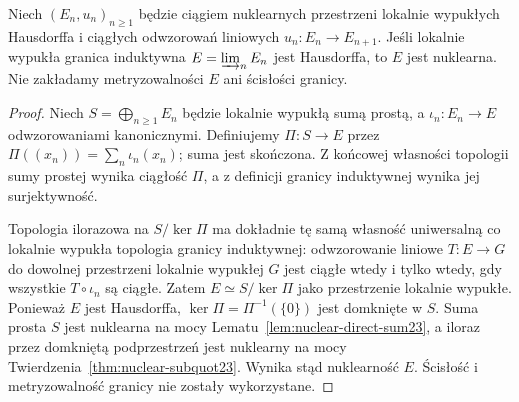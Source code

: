 \begin{twierdzenie}
\label{thm:nuclear-indlim23}
Niech $(E_n,u_n)_{n\ge1}$ będzie ciągiem nuklearnych
przestrzeni lokalnie wypukłych Hausdorffa i ciągłych
odwzorowań liniowych $u_n:E_n\to E_{n+1}$.
Jeśli lokalnie wypukła granica induktywna
$E=\varinjlim_n E_n$ jest Hausdorffa, to $E$ jest nuklearna.
Nie zakładamy metryzowalności $E$ ani ścisłości granicy.
\end{twierdzenie}
\begin{proof}
Niech $S=\bigoplus_{n\ge1}E_n$ będzie lokalnie wypukłą
sumą prostą, a $\iota_n:E_n\to E$ odwzorowaniami
kanonicznymi. Definiujemy
$\Pi:S\to E$ przez
$\Pi((x_n))=\sum_n\iota_n(x_n)$; suma jest skończona.
Z końcowej własności topologii sumy prostej wynika
ciągłość $\Pi$, a z definicji granicy induktywnej
wynika jej surjektywność.

Topologia ilorazowa na $S/\ker\Pi$ ma dokładnie tę samą
własność uniwersalną co lokalnie wypukła topologia
granicy induktywnej: odwzorowanie liniowe $T:E\to G$
do dowolnej przestrzeni lokalnie wypukłej $G$ jest ciągłe
wtedy i tylko wtedy, gdy wszystkie $T\circ\iota_n$ są ciągłe.
Zatem $E\simeq S/\ker\Pi$ jako przestrzenie lokalnie
wypukłe. Ponieważ $E$ jest Hausdorffa,
$\ker\Pi=\Pi^{-1}(\{0\})$ jest domknięte w $S$.
Suma prosta $S$ jest nuklearna na mocy
Lematu~\ref{lem:nuclear-direct-sum23}, a iloraz
przez domkniętą podprzestrzeń jest nuklearny na mocy
Twierdzenia~\ref{thm:nuclear-subquot23}. Wynika stąd
nuklearność $E$. Ścisłość i metryzowalność granicy
nie zostały wykorzystane.
\end{proof}

